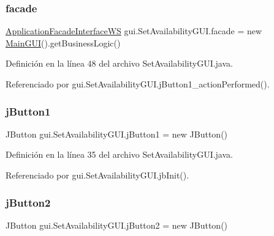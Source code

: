 \subsubsection{\texorpdfstring{facade}{facade}}
{\footnotesize\ttfamily \mbox{\hyperlink{interfacebusiness_logic_1_1_application_facade_interface_w_s}{Application\+Facade\+Interface\+WS}} gui.\+Set\+Availability\+G\+U\+I.\+facade = new \mbox{\hyperlink{classgui_1_1_main_g_u_i}{Main\+G\+UI}}().get\+Business\+Logic()\hspace{0.3cm}{\ttfamily [private]}}



Definición en la línea 48 del archivo Set\+Availability\+G\+U\+I.\+java.



Referenciado por gui.\+Set\+Availability\+G\+U\+I.\+j\+Button1\+\_\+action\+Performed().

\mbox{\label{classgui_1_1_set_availability_g_u_i_ab2d139775a7efa35d9ed682e2e12f73f}} 
\subsubsection{\texorpdfstring{jButton1}{jButton1}}
{\footnotesize\ttfamily J\+Button gui.\+Set\+Availability\+G\+U\+I.\+j\+Button1 = new J\+Button()\hspace{0.3cm}{\ttfamily [private]}}



Definición en la línea 35 del archivo Set\+Availability\+G\+U\+I.\+java.



Referenciado por gui.\+Set\+Availability\+G\+U\+I.\+jb\+Init().

\mbox{\label{classgui_1_1_set_availability_g_u_i_aae752324eac2634daf58978458c780cd}} 
\subsubsection{\texorpdfstring{jButton2}{jButton2}}
{\footnotesize\ttfamily J\+Button gui.\+Set\+Availability\+G\+U\+I.\+j\+Button2 = new J\+Button()\hspace{0.3cm}{\ttfamily [private]}}



